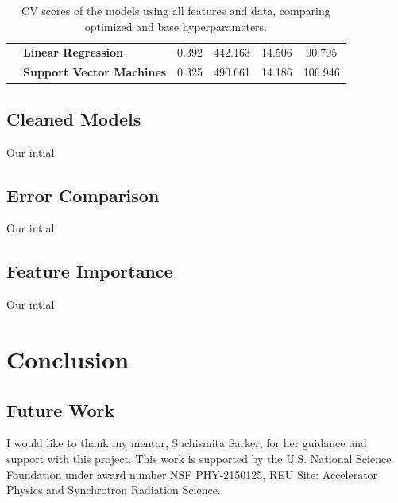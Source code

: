 \documentclass[twocolumn, nofootinbib, secnumarabic, amssymb, nobibnotes, aps, prd]{revtex4-2}
\begin{document}
\begin{table}[!hbt]
{\begin{tabular}{clcccc}
                                                                                                     & \textbf{Linear Regression}        & 0.392                           & 442.163                          & 14.506                           & 90.705                           \\
                                                                                                     & \textbf{Support Vector Machines}  & 0.325                           & 490.661                          & 14.186                           & 106.946                          \\ \hline
\end{tabular}%
}
\caption{CV scores of the models using all features and data, comparing optimized and base hyperparameters.}
\label{tab:results}
\end{table}

\subsection{Cleaned Models}
Our intial

\subsection{Error Comparison}
Our intial

\subsection{Feature Importance}
Our intial

\section{Conclusion}
\subsection{Future Work}

\begin{acknowledgments}
I would like to thank my mentor, Suchismita Sarker, for her guidance and support with this project. This work is supported by the U.S. National Science Foundation under award number NSF PHY-2150125, REU Site: Accelerator Physics and Synchrotron Radiation Science.
\end{acknowledgments}



\end{document}
